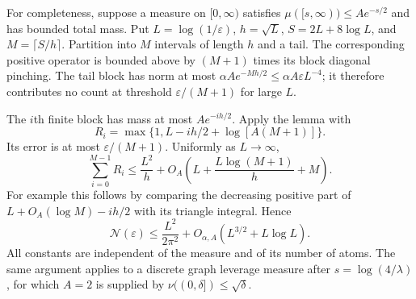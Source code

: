 \documentclass[11pt]{article}
\newcommand{\N}{\mathcal N}
\begin{document}
For completeness, suppose a measure on $[0,\infty)$ satisfies
$\mu([s,\infty))\le A e^{-s/2}$ and has bounded total mass. Put
$L=\log(1/\varepsilon)$, $h=\sqrt L$, $S=2L+8\log L$, and
$M=\lceil S/h\rceil$. Partition into $M$ intervals of length $h$
and a tail. The corresponding positive operator is bounded above by
$(M+1)$ times its block diagonal pinching. The tail block has norm
at most $\alpha A e^{-Mh/2}\le\alpha A\varepsilon L^{-4}$;
it therefore contributes no count at threshold
$\varepsilon/(M+1)$ for large $L$.

The $i$th finite block has mass at most $A e^{-ih/2}$. Apply the lemma
with
\[
 R_i=\max\{1,L-ih/2+\log[A(M+1)]\}.
\]
Its error is at most $\varepsilon/(M+1)$. Uniformly as $L\to\infty$,
\[
 \sum_{i=0}^{M-1}R_i
 \le\frac{L^2}{h}
 +O_A\left(L+\frac{L\log(M+1)}h+M\right).
\]
For example this follows by comparing the decreasing positive part
of $L+O_A(\log M)-ih/2$ with its triangle integral. Hence
\[
 \N(\varepsilon)
 \le \frac{L^2}{2\pi^2}+O_{\alpha,A}(L^{3/2}+L\log L).
\]
All constants are independent of the measure and of its number of
atoms. The same argument applies to a discrete graph leverage measure
after $s=\log(4/\lambda)$, for which $A=2$ is supplied by
$\nu((0,\delta])\le\sqrt\delta$.
\end{document}
